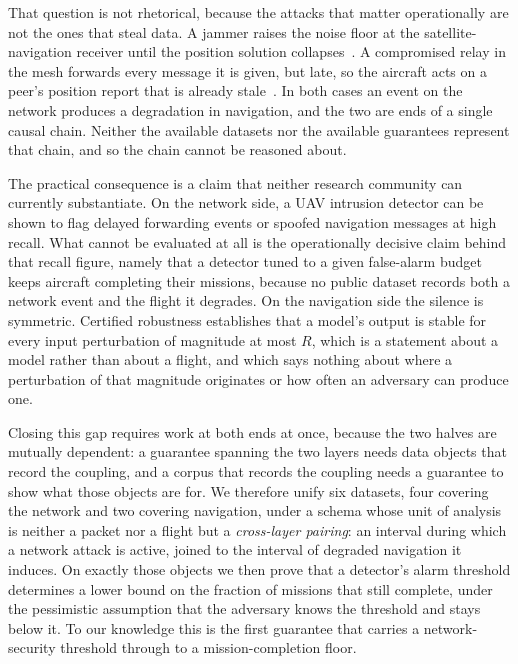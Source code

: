 That question is not rhetorical, because the attacks that matter operationally
are not the ones that steal data. A jammer raises the noise floor at the
satellite-navigation receiver until the position solution
collapses~\cite{kassas2022jammer}. A compromised relay in the mesh forwards
every message it is given, but late, so the aircraft acts on a peer's position
report that is already stale~\cite{datamut2026,lou2019timedelay}. In both
cases an event on the network produces a degradation in navigation, and the two
are ends of a single causal chain. Neither the available datasets nor the
available guarantees represent that chain, and so the chain cannot be reasoned
about.

The practical consequence is a claim that neither research community can
currently substantiate. On the network side, a UAV intrusion detector can be
shown to flag delayed forwarding events or spoofed navigation messages at high
recall. What cannot be evaluated at all is the operationally decisive claim
behind that recall figure, namely that a detector tuned to a given false-alarm
budget keeps aircraft completing their missions, because no public dataset
records both a network event and the flight it degrades. On the navigation side
the silence is symmetric. Certified robustness establishes that a model's output
is stable for every input perturbation of magnitude at most $R$, which is a
statement about a model rather than about a flight, and which says nothing about
where a perturbation of that magnitude originates or how often an adversary can
produce one.

Closing this gap requires work at both ends at once, because the two halves are
mutually dependent: a guarantee spanning the two layers needs data objects that
record the coupling, and a corpus that records the coupling needs a guarantee to
show what those objects are for. We therefore unify six datasets, four covering
the network and two covering navigation, under a schema whose unit of analysis
is neither a packet nor a flight but a \emph{cross-layer pairing}: an interval
during which a network attack is active, joined to the interval of degraded
navigation it induces. On exactly those objects we then prove that a detector's
alarm threshold determines a lower bound on the fraction of missions that still
complete, under the pessimistic assumption that the adversary knows the
threshold and stays below it. To our knowledge this is the first guarantee that
carries a network-security threshold through to a mission-completion floor.

